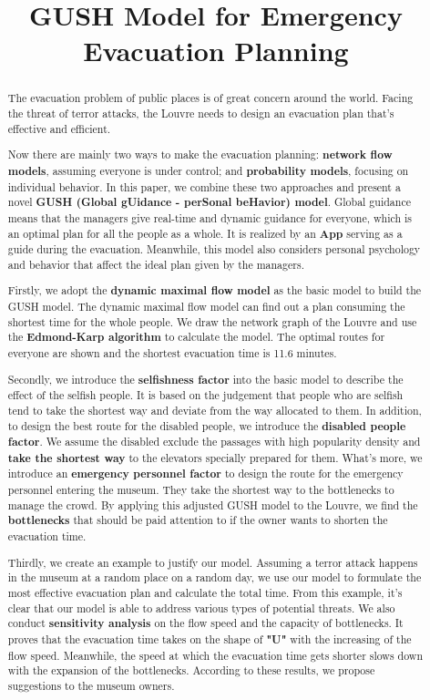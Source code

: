\documentclass[a4paper,12pt]{article}
\title{GUSH Model for Emergency Evacuation Planning}  %
\begin{document}
\begin{abstract}\footnotesize 
The evacuation problem of public places is of great concern around the world. Facing the threat of terror attacks, the Louvre needs to design an evacuation plan that's effective and efficient.  

Now there are mainly two ways to make the evacuation planning: \textbf{network flow models}, assuming everyone is under control; and \textbf{probability models}, focusing on individual behavior. In this paper, we combine these two approaches and present a novel \textbf{GUSH (Global gUidance - perSonal beHavior) model}. Global guidance means that the managers give real-time and dynamic guidance for everyone, which is an optimal plan for all the people as a whole. It is realized by an \textbf{App} serving as a guide during the evacuation. Meanwhile, this model also considers personal psychology and behavior that affect the ideal plan given by the managers. 

Firstly, we adopt the \textbf{dynamic maximal flow model} as the basic model to build the GUSH model. The dynamic maximal flow model can find out a plan consuming the shortest time for the whole people. We draw the network graph of the Louvre and use the \textbf{Edmond-Karp algorithm} to calculate the model. The optimal routes for everyone are shown and the shortest evacuation time is 11.6 minutes.

Secondly, we introduce the \textbf{selfishness factor} into the basic model to describe the effect of the selfish people. It is based on the judgement that people who are selfish tend to take the shortest way and deviate from the way allocated to them. In addition, to design the best route for the disabled people, we introduce the \textbf{disabled people factor}. We assume the disabled exclude the passages with high popularity density and \textbf{take the shortest way} to the elevators specially prepared for them. What's more, we introduce an \textbf{emergency personnel factor} to design the route for the emergency personnel entering the museum. They take the shortest way to the bottlenecks to manage the crowd. By applying this adjusted GUSH model to the Louvre, we find the \textbf{bottlenecks} that should be paid attention to if the owner wants to shorten the evacuation time.

Thirdly, we create an example to justify our model. Assuming a terror attack happens in the museum at a random place on a random day, we use our model to formulate the most effective evacuation plan and calculate the total time. From this example, it's clear that our model is able to address various types of potential threats. We also conduct \textbf{sensitivity analysis} on the flow speed and the capacity of bottlenecks. It proves that the evacuation time takes on the shape of \textbf{ "U" } with the increasing of the flow speed. Meanwhile, the speed at which the evacuation time gets shorter slows down with the expansion of the bottlenecks. According to these results, we propose suggestions to the museum owners.  


\end{abstract}
\end{document}
